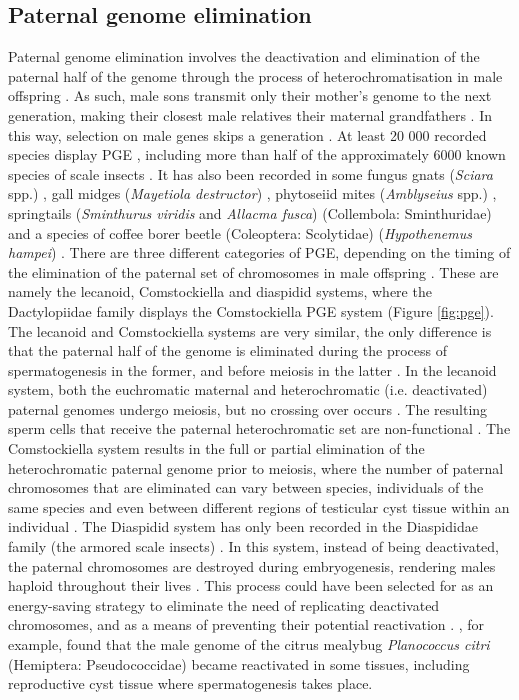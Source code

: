 \subsection{Paternal genome elimination}
Paternal genome elimination involves the deactivation and elimination of the paternal half of the genome through the process of heterochromatisation in male offspring \citep{Nur, Ross2010GenomicSystems}. As such, male sons transmit only their mother's genome to the next generation, making their closest male relatives their maternal grandfathers \citep{DelaFilia2015}. In this way, selection on male genes skips a generation \citep{DelaFilia2015}. At least 20 000 recorded species display PGE \citep{DelaFilia2015}, including more than half of the approximately 6000 known species of scale insects \citep{Burt2009}. It has also been recorded in some fungus gnats (\textit{Sciara} spp.) \citep{Haig1993b}, gall midges (\textit{Mayetiola destructor}) \citep{Haig1993}, phytoseiid mites (\textit{Amblyseius} spp.) \citep{Nelson-Rees1980}, springtails (\textit{Sminthurus viridis} and \textit{Allacma fusca}) (Collembola: Sminthuridae) \citep{Dallai2000} and a species of coffee borer beetle (Coleoptera: Scolytidae) (\textit{Hypothenemus hampei}) \citep{Brun1995}.
There are three different categories of PGE, depending on the timing of the elimination of the paternal set of chromosomes in male offspring \citep{Ross2010GenomicSystems}. These are namely the lecanoid, Comstockiella and diaspidid systems, where the Dactylopiidae family displays the Comstockiella PGE system \citep{Nur} (Figure \ref{fig:pge}). The lecanoid and Comstockiella systems are very similar, the only difference is that the paternal half of the genome is eliminated during the process of spermatogenesis in the former, and before meiosis in the latter \citep{Ross2010GenomicSystems}. In the lecanoid system, both the euchromatic maternal and heterochromatic (i.e. deactivated) paternal genomes undergo meiosis, but no crossing over occurs \citep{Burt2009}. The resulting sperm cells that receive the paternal heterochromatic set are non-functional \citep{Burt2009}. The Comstockiella system results in the full or partial elimination of the heterochromatic paternal genome prior to meiosis, where the number of paternal chromosomes that are eliminated can vary between species, individuals of the same species and even between different regions of testicular cyst tissue within an individual \citep{Burt2009}.
The Diaspidid system has only been recorded in the Diaspididae family (the armored scale insects) \citep{Nur, Ross2010GenomicSystems, Burt2009}. In this system, instead of being deactivated, the paternal chromosomes are destroyed during embryogenesis, rendering males haploid throughout their lives \citep{Ross2010GenomicSystems}. 
This process could have been selected for as an energy-saving strategy to eliminate the need of replicating deactivated chromosomes, and as a means of preventing their potential reactivation \citep{Burt2009}. \citet{Nur1967}, for example, found that the male genome of the citrus mealybug \textit{Planococcus citri} (Hemiptera: Pseudococcidae) became reactivated in some tissues, including reproductive cyst tissue where spermatogenesis takes place.
\vspace{0.4cm}

